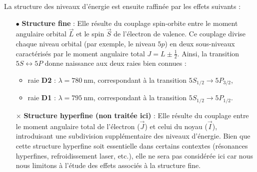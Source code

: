 La structure des niveaux d’énergie est ensuite raffinée par les effets suivants :
\begin{itemize}
  \item[$\bullet$] \textbf{Structure fine} : Elle résulte du couplage spin-orbite entre le moment angulaire orbital $\vec{L}$ et le spin $\vec{S}$ de l’électron de valence. Ce couplage divise chaque niveau orbital (par exemple, le niveau $5p$) en deux sous-niveaux caractérisés par le moment angulaire total $J = L \pm \tfrac{1}{2}$. Ainsi, la transition $5S \leftrightarrow 5P$ donne naissance aux deux raies bien connues :%
  		\begin{itemize}[label = $\circ$]
  			\item raie \textbf{D2} : \( \lambda = 780~\text{nm} \), correspondant à la transition \( 5S_{1/2} \rightarrow 5P_{3/2} \),
  			\item raie \textbf{D1} : \( \lambda = 795~\text{nm} \), correspondant à la transition \( 5S_{1/2} \rightarrow 5P_{1/2} \). 
  		\end{itemize}
  		
  
  \item[$\times$] \textbf{Structure hyperfine (non traitée ici)} : Elle résulte du couplage entre le moment angulaire total de l’électron ($\vec{J}$) et celui du noyau ($\vec{I}$), introduisant une subdivision supplémentaire des niveaux d’énergie. Bien que cette structure hyperfine soit essentielle dans certains contextes (résonances hyperfines, refroidissement laser, etc.), elle ne sera pas considérée ici car nous nous limitons à l’étude des effets associés à la structure fine.
\end{itemize}

